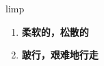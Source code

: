 
\begin{frame}
{\huge limp}
\begin{center}
\begin{enumerate}\Large
  \item \textbf{柔软的，松散的}
  \item \textbf{跛行，艰难地行走}
\end{enumerate}
\end{center}
\end{frame}

